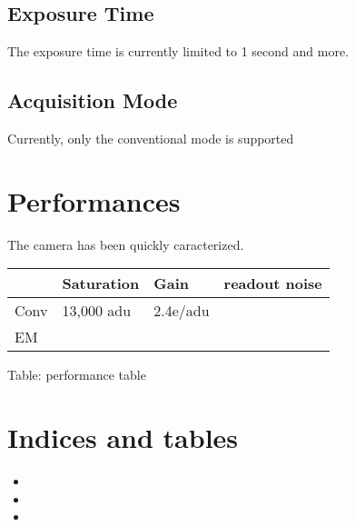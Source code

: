 \documentclass[letterpaper,10pt,english]{sphinxmanual}
\begin{document}
\section{Exposure Time}
\label{\detokenize{limitation:exposure-time}}
The exposure time is currently limited to 1 second and more.


\section{Acquisition Mode}
\label{\detokenize{limitation:acquisition-mode}}
Currently, only the conventional mode is supported


\chapter{Performances}
\label{\detokenize{performance:performances}}\label{\detokenize{performance::doc}}
The camera has been quickly caracterized.


\begin{savenotes}\sphinxattablestart
\centering
\begin{tabulary}{\linewidth}[t]{|T|T|T|T|}
\hline
\sphinxstyletheadfamily &\sphinxstyletheadfamily 
Saturation
&\sphinxstyletheadfamily 
Gain
&\sphinxstyletheadfamily 
readout noise
\\
\hline
Conv
&
13,000 adu
&
2.4e/adu
&\\
\hline
EM
&&&\\
\hline
\end{tabulary}
\par
\sphinxattableend\end{savenotes}

Table: performance table


\chapter{Indices and tables}
\label{\detokenize{index:indices-and-tables}}\begin{itemize}
\item {} 

\item {} 

\item {} 

\end{itemize}



\renewcommand{\indexname}{Index}
\printindex
\end{document}
